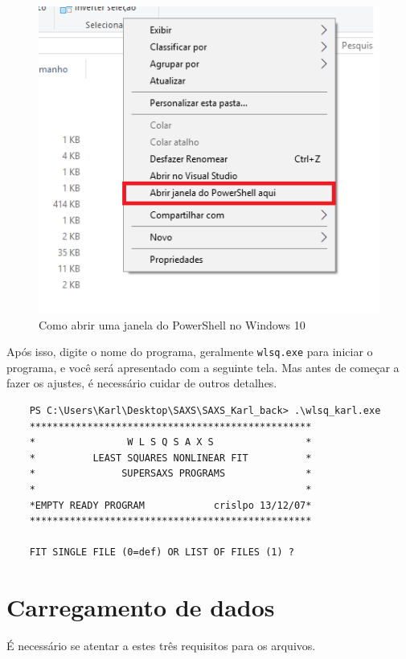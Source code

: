 \begin{apendicesenv}
\begin{figure}[t]
	\includegraphics[scale=0.5]{./imagens/saxs/supersaxs_Powershell}
	\centering
	\caption{Como abrir uma janela do PowerShell no Windows 10}
	\centering
\end{figure}

Após isso, digite o nome do programa, geralmente \texttt{wlsq.exe} para iniciar o programa, e você será apresentado com a seguinte tela. Mas antes de começar a fazer os ajustes, é necessário cuidar de outros detalhes.
\begin{samepage}
	\begin{verbatim}
	PS C:\Users\Karl\Desktop\SAXS\SAXS_Karl_back> .\wlsq_karl.exe
	*************************************************
	*                W L S Q S A X S                *
	*          LEAST SQUARES NONLINEAR FIT          *
	*               SUPERSAXS PROGRAMS              *
	*                                               *
	*EMPTY READY PROGRAM            crislpo 13/12/07*
	*************************************************
	
	FIT SINGLE FILE (0=def) OR LIST OF FILES (1) ?
	\end{verbatim}
\end{samepage}

\section{Carregamento de dados}

É necessário se atentar a estes três requisitos para os arquivos.


\end{apendicesenv}
